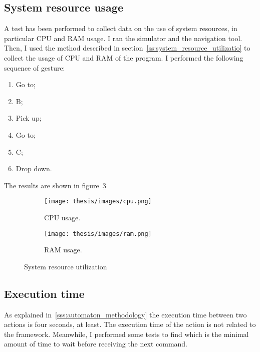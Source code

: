 \documentclass[../thesis.tex]{subfiles}
\begin{document}
\subsection{System resource usage}
A test has been performed to collect data on the use of system resources, in particular CPU and RAM usage. I ran the simulator and the navigation tool. Then, I used the method described in section~\ref{ss:system_resource_utilizatio} to collect the usage of CPU and RAM of the program. I performed the following sequence of gesture:
\begin{enumerate}
    \item Go to;
    \item B;
    \item Pick up;
    \item Go to;
    \item C;
    \item Drop down.
\end{enumerate}
The results are shown in figure~\ref{fig:system_resource_graphs}

\begin{figure}[H]
    \centering
    \begin{subfigure}[b]{0.45\textwidth}
        \centering
        \texttt{[image: thesis/images/cpu.png]}
        \caption{CPU usage.}
        \label{fig:cpu_usage}
    \end{subfigure}
    \hfill
    \begin{subfigure}[b]{0.45\textwidth}
        \centering
        \texttt{[image: thesis/images/ram.png]}
        \caption{RAM usage.}
        \label{fig:ram_usage}
    \end{subfigure}
    \caption{System resource utilization}
    \label{fig:system_resource_graphs}
\end{figure}

\subsection{Execution time}
As explained in~\ref{sss:automaton_methodology} the execution time between two actions is four seconds, at least. The execution time of the action is not related to the framework. Meanwhile, I performed some tests to find which is the minimal amount of time to wait before receiving the next command.
\end{document}
